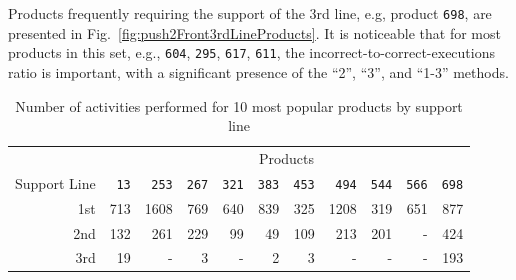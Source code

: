 \documentclass[lnbip]{svmultln}
\begin{document}



Products frequently requiring the support of the 3rd line, e.g, product \texttt{698}, are presented in Fig.~\ref{fig:push2Front3rdLineProducts}. It is noticeable that for most products in this set, e.g., \texttt{604}, \texttt{295}, \texttt{617}, \texttt{611}, the incorrect-to-correct-executions ratio is important, with a significant presence of the ``2'', ``3'', and ``1-3'' methods.

\begin{table}
\caption{Number of activities performed for 10 most popular products by support line}
\label{tab:activitiesPopularProductSL}
\begin{center}
\begin{tabular}{rrrrrrrrrrr}
& \multicolumn{10}{c}{Products}\\
\cline{2-11}\rule{0pt}{12pt}
Support Line	& 
\hspace{10pt}\texttt{13} & 
\hspace{2pt}\texttt{253} & 
\hspace{2pt}\texttt{267} & 
\hspace{2pt}\texttt{321} & 
\hspace{2pt}\texttt{383} & 
\hspace{2pt}\texttt{453} & 
\hspace{2pt}\texttt{494} & 
\hspace{2pt}\texttt{544} & 
\hspace{2pt}\texttt{566} & 
\hspace{2pt}\texttt{698} \\[2pt]
\hline\rule{0pt}{12pt}
1st	& 
713 & 
1608 & 
769 & 
640 & 
839 & 
325 & 
1208 & 
319 & 
651 & 
877 \\
2nd & 
132 &  
261 &  
229 &  
99 &  
49 &  
109 &  
213 &  
201 &  
- &  
424 \\
3rd &   
19 &    
- &    
3 &    
- &    
2 &    
3 &    
- &    
- &    
- &    
193 \\[2pt]
\hline
\end{tabular}
\end{center}
\end{table}
\end{document}
